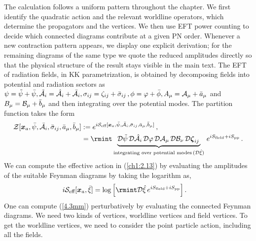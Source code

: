 The calculation follows a uniform pattern throughout the chapter. We first identify the quadratic action and the relevant worldline operators, which determine the propagators and the vertices. We then use EFT power counting to decide which connected diagrams contribute at a given PN order. Whenever a new contraction pattern appears, we display one explicit derivation; for the remaining diagrams of the same type we quote the reduced amplitudes directly so that the physical structure of the result stays visible in the main text. The EFT of radiation fields, in KK parametrization, is obtained by decomposing fields into potential and radiation sectors as $\psi=\Tilde{\psi}+\Bar{\psi},\Tilde{\mathcal{A}}_i=\Hat{\mathcal{A}}_i+\Bar{\mathcal{A}}_i,\sigma_{ij}=\zeta_{ij}+\Bar{\sigma}_{ij}\,,\phi=\varphi+\Bar{\phi}, A_{\mu}=\mathcal{A}_{\mu}+\Bar{a}_{\mu}$ and $B_{\mu}=\mathcal{B}_{\mu}+\Bar{b}_{\mu}$ and then integrating over the potential modes. The partition function takes the form
\begin{align}
\begin{split}
  \mathcal{Z}[\boldsymbol{x}_a,\Bar{\psi},\Bar{{\mathcal{A}}}_i,\Bar{\sigma}_{ij},\Bar{a}_{\mu},\Bar{b}_{\mu}]  &:=e^{i\mathcal{S}_{\text{eff}}[\boldsymbol{x}_a,\Bar{\psi},\Bar{{\mathcal{A}}}_i,\Bar{\sigma}_{ij},\Bar{a}_{\mu},\Bar{b}_{\mu}]}\,,\\ &
  =\rmint \underbrace{\mathcal{D}\tilde{\psi} \,\mathcal{D}\hat{\mathcal{A}}_{i}\,\mathcal{D}\varphi \,\mathcal{D}\mathcal{A}_{\mu}\,\mathcal{D}\mathcal{B}_{\nu}\,
  \mathcal{D}\boldsymbol{\zeta}_{ij}\,}_{\text{integrating over potential modes}\,(\mathcal{D}\hat{\xi})}\,e^{iS_{\text{field}}+iS_{\text{pp}}}\,.\label{ch1:2.13}
\end{split}
\end{align}
We can compute the effective action in (\ref{ch1:2.13}) by evaluating the  amplitudes of the suitable Feynman diagrams by taking the logarithm as,
\begin{align}
    \begin{split}
        i\mathcal{S}_{\text{eff}}[\boldsymbol{x}_a,\Bar{\xi}]&=\log\Big[{\rmint\mathcal{D}\hat\xi\,e^{iS_{\text{field}}+iS_{\text{pp}}}}\Big]\,.\label{4.3mm}
    \end{split}
\end{align}
One can compute (\ref{4.3mm}) perturbatively by evaluating the connected Feynman diagrams. We need two kinds of vertices, worldline vertices and field vertices. To get the worldline vertices, we need to consider the point particle action, including all the fields.
